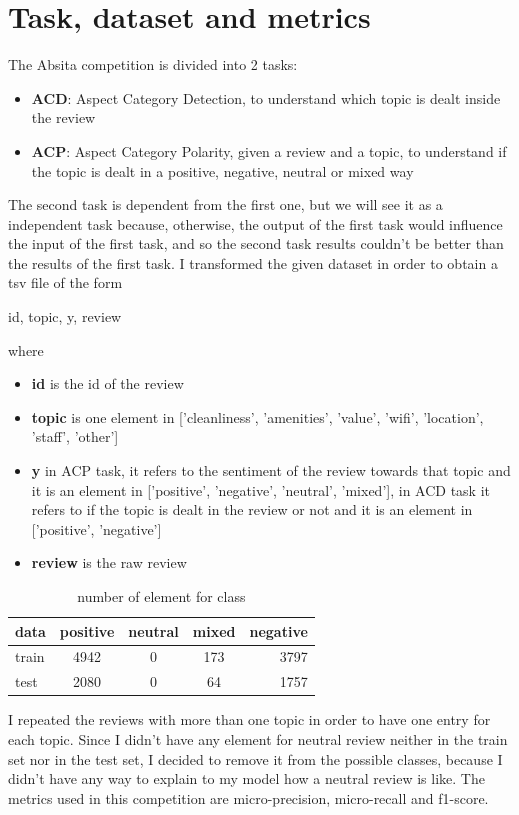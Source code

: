 \documentclass{article}
\begin{document}
    \section{Task, dataset and metrics}\label{sec:s1}
        The Absita competition is divided into 2 tasks:
        \begin{itemize}
            \item \textbf{ACD}: Aspect Category Detection, to understand which topic is dealt inside the review
            \item \textbf{ACP}: Aspect Category Polarity, given a review and a topic, to understand if the topic is dealt in a positive, negative, neutral or mixed way
        \end{itemize}
        The second task is dependent from the first one, but we will see it as a independent task because, otherwise,
        the output of the first task would influence the input of the first task, and so the second task results couldn't be better than the results of the first task.
        I transformed the given dataset in order to obtain a tsv file of the form
        \\\centerline{id, topic, y, review}
        where
        \begin{itemize}
            \item \textbf{id} is the id of the review
            \item \textbf{topic} is one element in ['cleanliness', 'amenities', 'value', 'wifi', 'location', 'staff', 'other']
            \item \textbf{y} in ACP task, it refers to the sentiment of the review towards that topic and it is an element in
            ['positive', 'negative', 'neutral', 'mixed'], in ACD task it refers to if the topic is dealt in the review or not and it is an element in ['positive', 'negative']
            \item \textbf{review} is the raw review
        \end{itemize}
        \begin{table}[h!]
            \begin{center}
                \caption{number of element for class}
                \label{tab:table1}
                \begin{tabular}{l|c|c|c|r}
                    \textbf{data} & \textbf{positive} & \textbf{neutral} & \textbf{mixed} & \textbf{negative}\\
                    \hline
                        train & 4942 & 0 & 173 & 3797\\
                        test & 2080 & 0 & 64 & 1757\\
                \end{tabular}
            \end{center}
        \end{table}
        I repeated the reviews with more than one topic in order to have one entry for each topic.
        Since I didn't have any element for neutral review neither in the train set nor in the test set, I decided to remove it from the possible classes,
        because I didn't have any way to explain to my model how a neutral review is like.
        The metrics used in this competition are micro-precision, micro-recall and f1-score.
\end{document}

